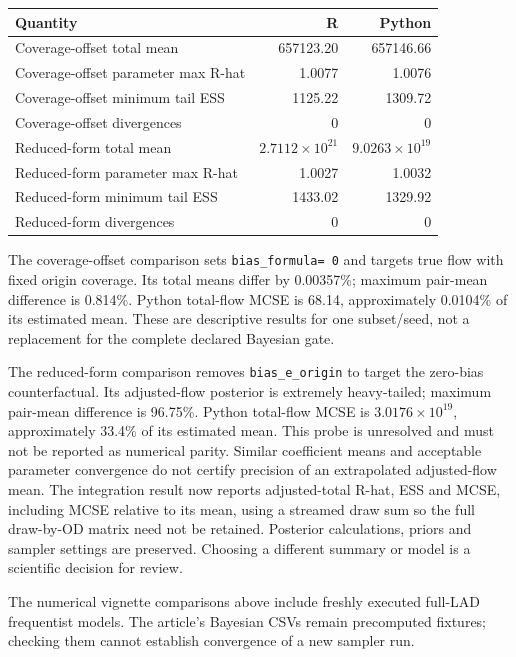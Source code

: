 \documentclass[10pt]{article}
\begin{document}
\begin{tabularx}{\textwidth}{@{}lrr@{}}
\toprule
Quantity & R & Python \\
\midrule
Coverage-offset total mean & 657123.20 & 657146.66 \\
Coverage-offset parameter max R-hat & 1.0077 & 1.0076 \\
Coverage-offset minimum tail ESS & 1125.22 & 1309.72 \\
Coverage-offset divergences & 0 & 0 \\
Reduced-form total mean & $2.7112\times10^{21}$ & $9.0263\times10^{19}$ \\
Reduced-form parameter max R-hat & 1.0027 & 1.0032 \\
Reduced-form minimum tail ESS & 1433.02 & 1329.92 \\
Reduced-form divergences & 0 & 0 \\
\bottomrule
\end{tabularx}

The coverage-offset comparison sets \texttt{bias\_formula=~0} and targets
true flow with fixed origin coverage. Its total means differ by 0.00357\%;
maximum pair-mean difference is 0.814\%. Python total-flow MCSE is 68.14,
approximately 0.0104\% of its estimated mean. These are descriptive results
for one subset/seed, not a replacement for the complete declared Bayesian gate.

The reduced-form comparison removes \texttt{bias\_e\_origin} to target the
zero-bias counterfactual. Its adjusted-flow posterior is extremely heavy-tailed;
maximum pair-mean difference is 96.75\%. Python total-flow MCSE is
$3.0176\times10^{19}$, approximately 33.4\% of its estimated mean. This probe
is unresolved and must not be reported as numerical parity. Similar coefficient
means and acceptable parameter convergence do not certify precision of an
extrapolated adjusted-flow mean. The integration result now reports adjusted-total
R-hat, ESS and MCSE, including MCSE relative to its mean, using a streamed draw
sum so the full draw-by-OD matrix need not be retained. Posterior calculations,
priors and sampler settings are preserved. Choosing a different summary or
model is a scientific decision for review.



The numerical vignette comparisons above include freshly executed full-LAD
frequentist models. The article's Bayesian CSVs remain precomputed fixtures;
checking them cannot establish convergence of a new sampler run.

\clearpage
\end{document}
